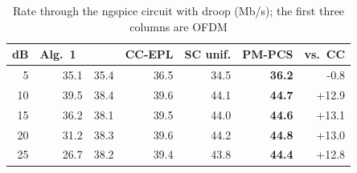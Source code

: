 \begin{table}[t]\centering\footnotesize\setlength{\tabcolsep}{3.2pt}
\caption{Rate through the ngspice circuit with droop (Mb/s); the first three columns are OFDM}\label{tab:pmspice}
\begin{tabular}{@{}rrrrrrr@{}}\toprule
dB & Alg.~1~\cite{pham2026} & \cite{ling2020} & CC-EPL & SC unif. & \textbf{PM-PCS} & vs.\ CC \\\midrule
5 & 35.1 & 35.4 & 36.5 & 34.5 & \textbf{36.2} & -0.8 \\
10 & 39.5 & 38.4 & 39.6 & 44.1 & \textbf{44.7} & +12.9 \\
15 & 36.2 & 38.1 & 39.5 & 44.0 & \textbf{44.6} & +13.1 \\
20 & 31.2 & 38.3 & 39.6 & 44.2 & \textbf{44.8} & +13.0 \\
25 & 26.7 & 38.2 & 39.4 & 43.8 & \textbf{44.4} & +12.8 \\
\bottomrule\end{tabular}\end{table}
